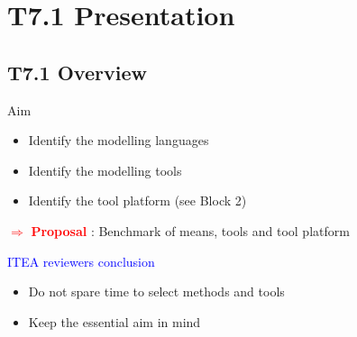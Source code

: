 
\section{T7.1 Presentation}

\subsection{T7.1 Overview}

\begin{frame}{Aim}

  \begin{itemize}
  \item
    Identify the modelling languages
  \item
    Identify the modelling tools
  \item 
  	Identify the tool platform (see Block 2)
  \end{itemize}
  
  \textcolor{red}{$ \Rightarrow $ \bf{Proposal} } :
   Benchmark of means, tools and tool platform

\pause   
   
   \textcolor{blue}{ITEA reviewers conclusion}
   \begin{itemize}
   \item Do not spare time to select methods and tools
   \item Keep the essential aim in mind
   \end{itemize}
\end{frame}



